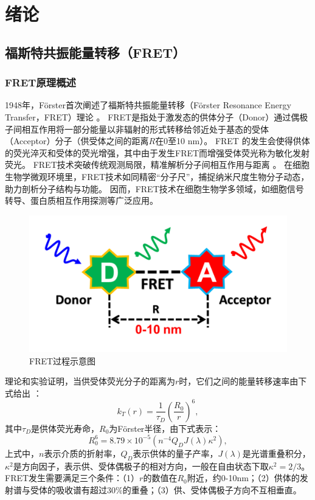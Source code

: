 \chapter{绪论}

\section{福斯特共振能量转移（FRET）}

\subsection{FRET原理概述}

\ifshowtext
1948年，Förster首次阐述了福斯特共振能量转移（Förster Resonance Energy Transfer，FRET）理论 。
FRET是指处于激发态的供体分子（Donor）通过偶极子间相互作用将一部分能量以非辐射的形式转移给邻近处于基态的受体（Acceptor）分子（供受体之间的距离$R$在0至10 nm）。
FRET 的发生会使得供体的荧光淬灭和受体的荧光增强，其中由于发生FRET而增强受体荧光称为敏化发射荧光。
FRET技术突破传统观测局限，精准解析分子间相互作用与距离 。
在细胞生物学微观环境里，FRET技术如同精密“分子尺”，捕捉纳米尺度生物分子动态，助力剖析分子结构与功能。
因而，FRET技术在细胞生物学多领域，如细胞信号转导、蛋白质相互作用探测等广泛应用。
\begin{figure}[htbp]
    \centering
    \includegraphics[width=0.5\linewidth]{../figures/1/1_FRET过程示意图.png}
    \caption{FRET过程示意图}
    \label{fig:fret}
\end{figure}

理论和实验证明，当供受体荧光分子的距离为$r$时，它们之间的能量转移速率由下式给出 ：
\begin{equation}
    k_T(r)=\frac{1}{\tau_D}(\frac{R_0}{r})^6, \label{eq:1-1}
\end{equation}
其中$\tau_D$是供体荧光寿命，$R_0$为Förster半径，由下式表示：
\begin{equation}
    R_0^6=8.79\times{10^{-5}}(n^{-4}Q_DJ(\lambda)\kappa^2),
\end{equation}
上式中，$n$表示介质的折射率，$Q_D$表示供体的量子产率，$J(\lambda)$是光谱重叠积分，$\kappa^2$是方向因子，表示供、受体偶极子的相对方向，一般在自由状态下取$\kappa^2=2/3$。FRET发生需要满足三个条件：（1）$r$的数值在$R_0$附近，约0-10nm；（2）供体的发射谱与受体的吸收谱有超过30\%的重叠；（3）供、受体偶极子方向不互相垂直。


